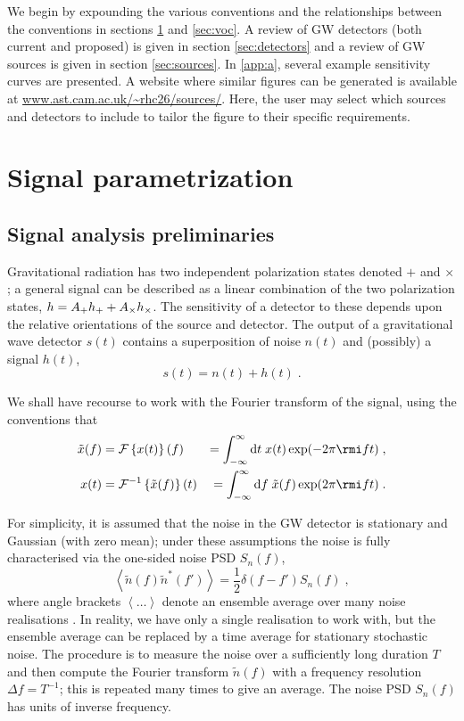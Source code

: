 We begin by expounding the various conventions and the relationships between the conventions in sections \ref{sec:conventions} and \ref{sec:voc}. A review of GW detectors (both current and proposed) is given in section \ref{sec:detectors} and a review of GW sources is given in section \ref{sec:sources}. In \ref{app:a}, several example sensitivity curves are presented. A website where similar figures can be generated is available at \url{www.ast.cam.ac.uk/~rhc26/sources/}. Here, the user may select which sources and detectors to include to tailor the figure to their specific requirements.


\section{Signal parametrization}\label{sec:conventions}

\subsection{Signal analysis preliminaries}

Gravitational radiation has two independent polarization states denoted $+$ and $\times$; a general signal can be described as a linear combination of the two polarization states, $h \nobreak=\nobreak A_{+} h_{+}\nobreak +\nobreak A_{\times} h_{\times}$. The sensitivity of a detector to these depends upon the relative orientations of the source and detector. The output of a gravitational wave detector $s(t)$ contains a superposition of noise $n(t)$ and (possibly) a signal $h(t)$,
\begin{equation}
s(t) = n(t)+h(t) \; .
\end{equation}

We shall have recourse to work with the Fourier transform of the signal, using the conventions that
\begin{eqnarray} \label{eq:defFourier}
\tilde{x}(f) &= {\mathcal{F}}\left\{x(t)\right\}(f) &= \int_{-\infty}^{\infty}\mathrm{d}t\;x(t)\exp (-2\pi \rmi f t ) \; , \\
x(t) &= {\mathcal{F}}^{-1}\left\{\tilde{x}(f)\right\}(t) &= \int_{-\infty}^{\infty}\mathrm{d}f\;\tilde{x}(f)\exp (2\pi \rmi f t ) \; .
\end{eqnarray}

For simplicity, it is assumed that the noise in the GW detector is stationary and Gaussian (with zero mean); under these assumptions the noise is fully characterised via the one-sided noise PSD $S_{n}(f)$, 
\begin{equation}\label{eq:psd}
\left<\tilde{n}(f)\tilde{n}^{*}(f')\right>=\frac{1}{2}\delta (f-f')S_{n}(f) \; ,
\end{equation}
where angle brackets $\left<\ldots\right>$ denote an ensemble average over many noise realisations \citep{Cutler1994}. In reality, we have only a single realisation to work with, but the ensemble average can be replaced by a time average for stationary stochastic noise. The procedure is to measure the noise over a sufficiently long duration $T$ and then compute the Fourier transform $\tilde{n}(f)$ with a frequency resolution $\Delta f = T^{-1}$; this is repeated many times to give an average. The noise PSD $S_{n}(f)$ has units of inverse frequency.

